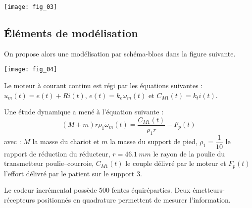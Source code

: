 \begin{multicols}{2}
\begin{center}
\texttt{[image: fig\_03]}
\end{center}

\fi

\subsection*{Éléments de modélisation}

\ifprof
\else
On propose alors une modélisation par schéma-blocs dans la figure suivante. 
\begin{center}
\texttt{[image: fig\_04]}
\end{center}

Le moteur à courant continu est régi par les équations suivantes :
$ u_m(t)=e(t)+Ri(t)$, $e(t)=k_e\omega_m(t)$ et $C_{M1}(t)=k_t i(t)$. 

Une étude dynamique a mené à l'équation suivante : 
$$\left(M+m\right)r\rho_1 \dot{\omega}_m(t)=\dfrac{C_{M1}(t)}{\rho_1 r}-F_p(t)$$ avec : $M$ la masse du chariot et $m$ la masse du support de pied, $\rho_1=\dfrac{1}{10}$ le rapport de réduction du réducteur, $r=\SI{46,1}{mm}$ le rayon de la poulie du transmetteur poulie--courroie, $C_{M1}(t)$ le couple délivré par le moteur et $F_p(t)$ l'effort délivré par le patient sur le support 3. 

Le codeur incrémental possède 500 fentes équiréparties. Deux émetteurs-récepteurs positionnés en quadrature permettent de mesurer l'information. 
\fi


\end{multicols}
